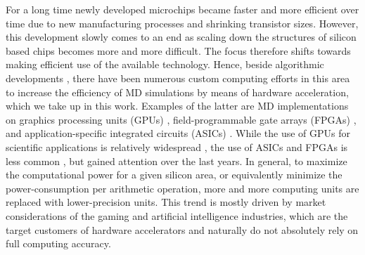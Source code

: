 \documentclass[format=acmsmall,review,timestamp,urlbreakonhyphens]{acmart}
\begin{document}
For a long time newly developed microchips became faster and more efficient over time due to new manufacturing processes and shrinking transistor sizes. However, this development slowly comes to an end as scaling down the structures of silicon based chips becomes more and more difficult. The focus therefore shifts towards making efficient use of the available technology. Hence, beside algorithmic developments \cite{MTS, Snir, GSE, Shaw, VerletCell, pSHAKE, John, Prodan}, there have been numerous custom computing efforts in this area to increase the efficiency of MD simulations by means of hardware acceleration, which we take up in this work. Examples of the latter are MD implementations on graphics processing units (GPUs) \cite{HOOMD, NAMD, OpenMM, HalMD, Lammps, Amber, Gromacs}, field-programmable gate arrays (FPGAs) \cite{HerbordtI, HerbordtII}, and application-specific integrated circuits (ASICs) \cite{AntonI, AntonII}.
While the use of GPUs for scientific applications is relatively widespread \cite{GPUcomp,Binder,Weigel}, the use of ASICs \cite{QCDScience, QCDOC, GrapeScience, Grape} and FPGAs is less common \cite{JanusI, JanusII, Convey, FDTD, Kenter, Galerkin}, but gained attention over the last years.
In general, to maximize the computational power for a given silicon area, or equivalently minimize the power-consumption per arithmetic operation, more and more computing units are replaced with lower-precision units. This trend is mostly driven by market considerations of the gaming and artificial intelligence industries, which are the target customers of hardware accelerators and naturally do not absolutely rely on full computing accuracy.

\end{document}
